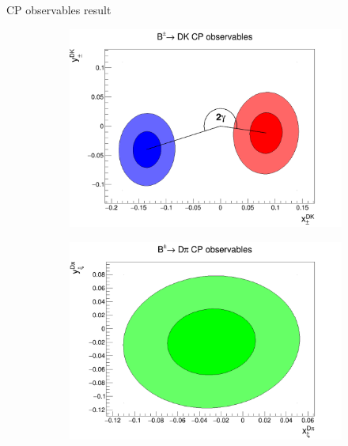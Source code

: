\documentclass{beamer}
\begin{document}
\begin{frame}{CP observables result}
  \begin{figure}
    \centering
    \begin{subfigure}{0.50\textwidth}
      \includegraphics[width = 1.0\textwidth]{Plots/B2DK_CP_Observables_Contours.png}
    \end{subfigure}%
    \begin{subfigure}{0.50\textwidth}
      \includegraphics[width = 1.0\textwidth]{Plots/B2Dpi_CP_Observables_Contours.png}
    \end{subfigure}
  \end{figure}
  \begin{center}
    \huge \vphantom{Could there be a sign error in $s_i$?}
  \end{center}
\end{frame}
\end{document}
